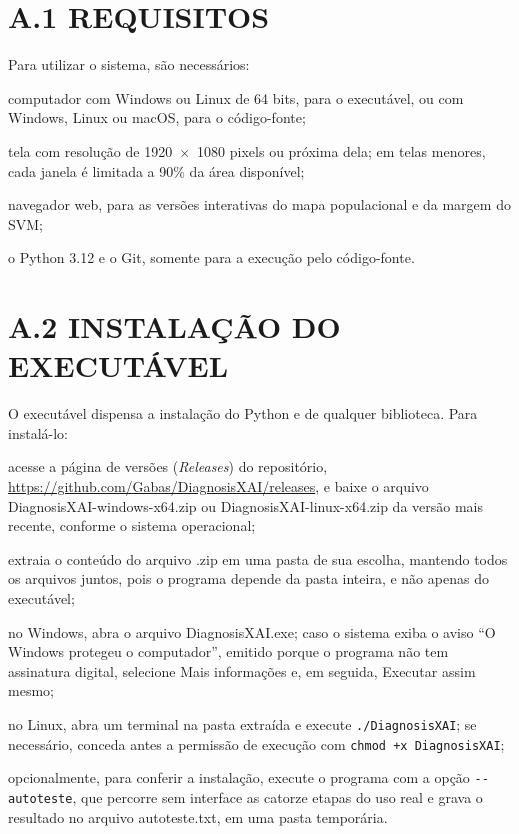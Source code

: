 \section*{A.1 REQUISITOS}

Para utilizar o sistema, são necessários:

\begin{alineas}
    \item computador com Windows ou Linux de 64 bits, para o executável, ou com
          Windows, Linux ou macOS, para o código-fonte;
    \item tela com resolução de 1920~$\times$~1080 pixels ou próxima dela; em
          telas menores, cada janela é limitada a 90\% da área disponível;
    \item navegador web, para as versões interativas do mapa populacional e da
          margem do SVM;
    \item o Python 3.12 e o Git, somente para a execução pelo código-fonte.
\end{alineas}

\section*{A.2 INSTALAÇÃO DO EXECUTÁVEL}

O executável dispensa a instalação do Python e de qualquer biblioteca. Para
instalá-lo:

\begin{alineas}
    \item acesse a página de versões (\textit{Releases}) do repositório,
          \url{https://github.com/Gabas/DiagnosisXAI/releases}, e baixe o
          arquivo DiagnosisXAI-windows-x64.zip ou DiagnosisXAI-linux-x64.zip
          da versão mais recente, conforme o sistema operacional;
    \item extraia o conteúdo do arquivo .zip em uma pasta de sua escolha,
          mantendo todos os arquivos juntos, pois o programa depende da pasta
          inteira, e não apenas do executável;
    \item no Windows, abra o arquivo DiagnosisXAI.exe; caso o sistema exiba o
          aviso ``O Windows protegeu o computador'', emitido porque o programa
          não tem assinatura digital, selecione Mais informações e, em seguida,
          Executar assim mesmo;
    \item no Linux, abra um terminal na pasta extraída e execute
          \texttt{./DiagnosisXAI}; se necessário, conceda antes a permissão de
          execução com \texttt{chmod +x DiagnosisXAI};
    \item opcionalmente, para conferir a instalação, execute o programa com a
          opção \texttt{-}\texttt{-autoteste}, que percorre sem interface as
          catorze etapas do uso real e grava o resultado no arquivo
          autoteste.txt, em uma pasta temporária.
\end{alineas}

